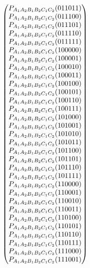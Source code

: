 \documentclass[aps,english,10pt,superscriptaddress,onecolumn,twoside,longbibliography,pra,floatfix,fleqn,nofootinbib]{revtex4-1}%
\theoremstyle{definition}
\newcommand{\p}[2][]{{P_{#1}}\parenths{#2}}
\DeclarePairedDelimiter{\parenths}{\lparen}{\rparen}
\begin{document}
\begin{align}
{\begin{pmatrix}
 \p[A_1 A_2 B_1 B_2 C_1 C_2]{0 1 1 0 1 1} \\
 \p[A_1 A_2 B_1 B_2 C_1 C_2]{0 1 1 1 0 0} \\
 \p[A_1 A_2 B_1 B_2 C_1 C_2]{0 1 1 1 0 1} \\
 \p[A_1 A_2 B_1 B_2 C_1 C_2]{0 1 1 1 1 0} \\
 \p[A_1 A_2 B_1 B_2 C_1 C_2]{0 1 1 1 1 1} \\
 \p[A_1 A_2 B_1 B_2 C_1 C_2]{1 0 0 0 0 0} \\
 \p[A_1 A_2 B_1 B_2 C_1 C_2]{1 0 0 0 0 1} \\
 \p[A_1 A_2 B_1 B_2 C_1 C_2]{1 0 0 0 1 0} \\
 \p[A_1 A_2 B_1 B_2 C_1 C_2]{1 0 0 0 1 1} \\
 \p[A_1 A_2 B_1 B_2 C_1 C_2]{1 0 0 1 0 0} \\
 \p[A_1 A_2 B_1 B_2 C_1 C_2]{1 0 0 1 0 1} \\
 \p[A_1 A_2 B_1 B_2 C_1 C_2]{1 0 0 1 1 0} \\
 \p[A_1 A_2 B_1 B_2 C_1 C_2]{1 0 0 1 1 1} \\
 \p[A_1 A_2 B_1 B_2 C_1 C_2]{1 0 1 0 0 0} \\
 \p[A_1 A_2 B_1 B_2 C_1 C_2]{1 0 1 0 0 1} \\
 \p[A_1 A_2 B_1 B_2 C_1 C_2]{1 0 1 0 1 0} \\
 \p[A_1 A_2 B_1 B_2 C_1 C_2]{1 0 1 0 1 1} \\
 \p[A_1 A_2 B_1 B_2 C_1 C_2]{1 0 1 1 0 0} \\
 \p[A_1 A_2 B_1 B_2 C_1 C_2]{1 0 1 1 0 1} \\
 \p[A_1 A_2 B_1 B_2 C_1 C_2]{1 0 1 1 1 0} \\
 \p[A_1 A_2 B_1 B_2 C_1 C_2]{1 0 1 1 1 1} \\
 \p[A_1 A_2 B_1 B_2 C_1 C_2]{1 1 0 0 0 0} \\
 \p[A_1 A_2 B_1 B_2 C_1 C_2]{1 1 0 0 0 1} \\
 \p[A_1 A_2 B_1 B_2 C_1 C_2]{1 1 0 0 1 0} \\
 \p[A_1 A_2 B_1 B_2 C_1 C_2]{1 1 0 0 1 1} \\
 \p[A_1 A_2 B_1 B_2 C_1 C_2]{1 1 0 1 0 0} \\
 \p[A_1 A_2 B_1 B_2 C_1 C_2]{1 1 0 1 0 1} \\
 \p[A_1 A_2 B_1 B_2 C_1 C_2]{1 1 0 1 1 0} \\
 \p[A_1 A_2 B_1 B_2 C_1 C_2]{1 1 0 1 1 1} \\
 \p[A_1 A_2 B_1 B_2 C_1 C_2]{1 1 1 0 0 0} \\
 \p[A_1 A_2 B_1 B_2 C_1 C_2]{1 1 1 0 0 1} \\

\end{pmatrix}}
\end{align}
\end{document}
